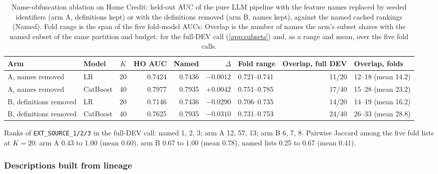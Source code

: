 \documentclass[final,5p,twocolumn]{elsarticle}
\newcommand{\Kfeat}{K}
\begin{document}
\begin{table}[htbp]
\centering
\footnotesize
\begin{threeparttable}
\caption{Name-obfuscation ablation on Home Credit: held-out AUC of the pure LLM pipeline with the feature names replaced by seeded identifiers (arm A, definitions kept) or with the definitions removed (arm B, names kept), against the named cached rankings (Named). Fold range is the span of the five fold-model AUCs. Overlap is the number of names the arm's subset shares with the named subset of the same partition and budget: for the full-DEV call (\ref{app:subsets}) and, as a range and mean, over the five fold calls.}
\label{tab:obfuscation}
\begin{tabular}{@{}llcrrrlrl@{}}
\toprule
Arm & Model & $\Kfeat$ & HO AUC & Named & $\Delta$ & Fold range & Overlap, full DEV & Overlap, folds \\
\midrule
A, names removed & LR & 20 & 0.7424 & 0.7436 & $-0.0012$ & 0.721--0.741 & 11/20 & 12--18 (mean 14.2) \\
A, names removed & CatBoost & 40 & 0.7977 & 0.7935 & $+0.0042$ & 0.751--0.785 & 17/40 & 15--28 (mean 23.2) \\
B, definitions removed & LR & 20 & 0.7146 & 0.7436 & $-0.0290$ & 0.706--0.735 & 14/20 & 14--19 (mean 16.2) \\
B, definitions removed & CatBoost & 40 & 0.7625 & 0.7935 & $-0.0310$ & 0.731--0.753 & 24/40 & 26--33 (mean 28.8) \\
\bottomrule
\end{tabular}
\begin{tablenotes}\footnotesize
\item Ranks of \texttt{EXT\_SOURCE\_1/2/3} in the full-DEV call: named 1, 2, 3; arm A 12, 57, 13; arm B 6, 7, 8. Pairwise Jaccard among the five fold lists at $\Kfeat=20$: arm A 0.43 to 1.00 (mean 0.60), arm B 0.67 to 1.00 (mean 0.78), named lists 0.25 to 0.67 (mean 0.41).
\end{tablenotes}
\end{threeparttable}
\end{table}

\subsubsection{Descriptions built from lineage}
\label{subsec:mechanical_results}
\end{document}
